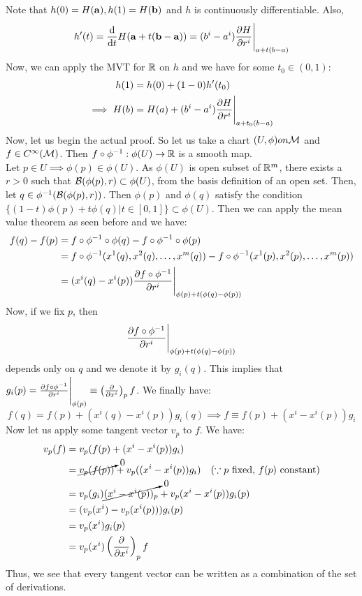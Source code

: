Note that $h(0) = H(\boldsymbol{\mathbf{a}}), h(1) = H(\boldsymbol{\mathbf{b}})$ and $h$ is continuously differentiable. Also,
$$h'(t) = \dv{t} H(\boldsymbol{\mathbf{a}}+t(\boldsymbol{\mathbf{b}}-\boldsymbol{\mathbf{a}})) = (b^i - a^i)\pdv{H}{r^i}\Bigg|_{a+t(b-a)}$$
Now, we can apply the MVT for $\mathbb{R}$ on $h$ and we have for some $t_0\in (0,1)$:
\begin{align*}
  h(1) &= h(0) + (1-0)h'(t_0)\\
\implies H(b) &= H(a) +  (b^i - a^i)\pdv{H}{r^i}\Bigg|_{a+t_0(b-a)}
\end{align*}
Now, let us begin the actual proof. So let us take a chart $(U,\phi) on \mathcal M$ and $f\in C^\infty(\mathcal M)$. Then $f\circ\phi^{-1}: \phi(U)\rightarrow \mathbb{R}$ is a smooth map.\\[0.2cm]
Let $p\in U\implies \phi(p)\in \phi(U)$. As $\phi(U)$ is open subset of $\mathbb{R}^m$, there exists a $r>0$ such that $\mathcal B(\phi(p), r)\subset \phi(U)$, from the basis definition of an open set. Then, let $q\in \phi^{-1}(\mathcal B(\phi(p), r))$. Then $\phi(p)$ and $\phi(q)$ satisfy the condition $\{(1-t)\phi(p) +t\phi(q)|t\in[0,1]\}\subset \phi(U)$. Then we can apply the mean value theorem as seen before and we have:
\begin{align*}
  f(q)-f(p) &= f\circ\phi^{-1} \circ \phi(q) - f\circ\phi^{-1} \circ \phi(p)\\
&=f\circ\phi^{-1}(x^1(q), x^2(q),\ldots,x^m(q)) - f\circ\phi^{-1}(x^1(p), x^2(p),\ldots,x^m(p))\\
&=(x^i(q)-x^i(p))\pdv{f\circ\phi^{-1}}{r^i}\Bigg|_{\phi(p) +t(\phi(q)-\phi(p))}
\end{align*}
Now, if we fix $p$, then $$\pdv{f\circ\phi^{-1}}{r^i}\Bigg|_{\phi(p) +t(\phi(q)-\phi(p))}$$ depends only on $q$ and we denote it by $g_i(q)$. This implies that $g_i(p) = \pdv{f\circ\phi^{-1}}{r^i}\Bigg|_{\phi(p)} \equiv \left( \pdv{x^i} \right)_p f$. We finally have:
$$f(q)=f(p)+(x^i(q)-x^i(p))g_i(q)\implies f\equiv f(p)+(x^i-x^i(p))g_i$$
Now let us apply some tangent vector $v_p$ to $f$. We have:
\begin{align*}
  v_p(f) &= v_p(f(p)+(x^i-x^i(p))g_i)\\
  &=\cancelto{0}{v_p(f(p))}+v_p((x^i-x^i(p))g_i) \quad (\because p \text{ fixed, $f(p)$ constant})\\
  &=v_p(g_i)\cancelto{0}{(x^i-x^i(p))_p} + v_p(x^i - x^i(p))g_i(p)\\
  &=(v_p(x^i) - v_p(x^i(p)))g_i(p)\\
  &=v_p(x^i)g_i(p) \\
  &= v_p(x^i)\left( \pdv{x^i} \right)_p f
\end{align*}
Thus, we see that every tangent vector can be written as a combination of the set of derivations.\\[0.2cm]
